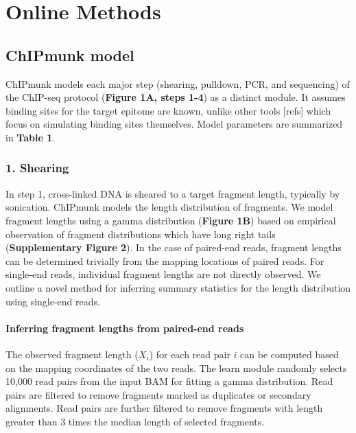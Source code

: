 \documentclass[12pt]{article}
\begin{document}
\section*{Online Methods}

\subsection*{ChIPmunk model}

ChIPmunk models each major step (shearing, pulldown, PCR, and sequencing) of the ChIP-seq protocol (\textbf{Figure 1A, steps 1-4}) as a distinct module. It assumes binding sites for the target epitome are known, unlike other tools [refs] which focus on simulating binding sites themselves. Model parameters are summarized in \textbf{Table 1}.

\subsubsection*{1. Shearing}

In step 1, cross-linked DNA is sheared to a target fragment length, typically by sonication.
ChIPmunk models the length distribution of fragments.
We model fragment lengths using a gamma distribution (\textbf{Figure 1B}) based on empirical observation of fragment distributions which have long right tails (\textbf{Supplementary Figure 2}).
In the case of paired-end reads, fragment lengths can be determined trivially from the mapping locations of paired reads.
For single-end reads, individual fragment lengths are not directly observed. We outline a novel method for inferring summary statistics for the length distribution using single-end reads.

\paragraph{Inferring fragment lengths from paired-end reads}
The observed fragment length ($X_i$) for each read pair $i$ can be computed based on the mapping coordinates of the two reads.
The learn module randomly selects 10,000 read pairs from the input BAM for fitting a gamma distribution.
Read pairs are filtered to remove fragments marked as duplicates or secondary alignments. %
Read pairs are further filtered to remove fragments with length greater than 3 times the median length of selected fragments.
\end{document}
